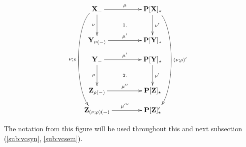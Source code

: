 \begin{figure}[hbt]
\[\xymatrix@R=0.4cm@C=1.5cm{
\thr X_\weak \ar[r]^\mu \ar[dd]_\nu   \ar@(l,l)[dddddd]_{\nu;\rho}  \ar@{}[ddr]|{1.}
  & \thr{P[X]_\cons} \ar[dd]^{\nu'} \ar@(r,r)[dddddd]^{(\nu;\rho)'} \\ \\ 
\thr Y_{\nu(\weak)} \ar[r]^{\mu'} & \thr{P[Y]_\cons} \\ 
%
\thr Y_\weak \ar[r]^{\mu'} \ar[dd]_\rho \ar@{}[ddr]|{2.}
  & \thr{P[Y]_\cons} \ar[dd]^{\rho'} \\ \\ 
\thr Z_{\rho(\weak)} \ar[r]^{\mu''} & \thr{P[Z]_\cons} \\ 
\thr Z_{(\nu;\rho)(\weak)} \ar[r]^{\mu'''} & \thr{P[Z]'_\cons} \\ 
}\vspace*{-2ex}
\]
\caption{}\label{fi:vertcomp}\vspace*{-1ex}
\end{figure}

\noindent
The notation from this figure will be used throughout this and next
subsection (\ref{sub:vcsyn}, \ref{sub:vcsem}).
 
